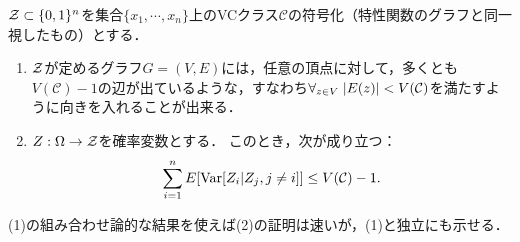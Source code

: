 \documentclass[uplatex,dvipdfmx]{jsreport}
\renewcommand{\C}{\mathcal{C}}
\begin{document}
\begin{lemma}
    $\mathcal{Z}\subset\{0,1\}^n$を集合$\{x_1,\cdots,x_n\}$上のVCクラス$\C$の符号化（特性関数のグラフと同一視したもの）とする．
    \begin{enumerate}
        \item $\mathcal{Z}$が定めるグラフ$G=(V,E)$には，任意の頂点に対して，多くとも$V(\C)-1$の辺が出ているような，すなわち$\forall_{z\in V}\;\abs{E(z)}<V(\C)$を満たすように向きを入れることが出来る．
        \item $Z:\Omega\to\mathcal{Z}$を確率変数とする．
        このとき，次が成り立つ：
        \[\sum^n_{i=1}E[\Var[Z_i|Z_j,j\ne i]]\le V(\C)-1.\]
    \end{enumerate}
\end{lemma}
\begin{remarks}
    (1)の組み合わせ論的な結果を使えば(2)の証明は速いが，(1)と独立にも示せる．
\end{remarks}
\end{document}
